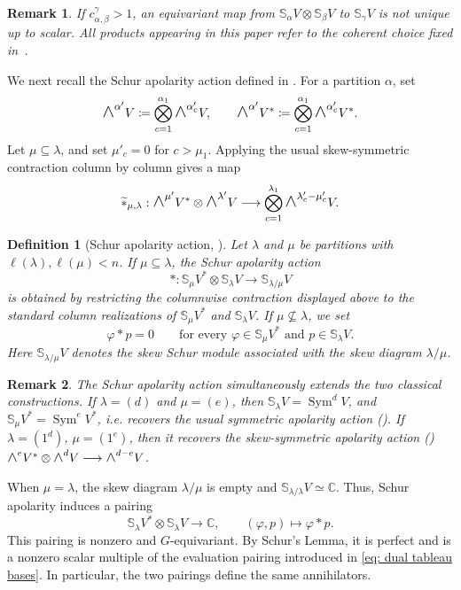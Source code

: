 \documentclass[a4paper,reqno]{amsart}
\theoremstyle{plainnopunct}
\theoremstyle{definitionnopunct}
\newtheorem{definition}[definition]{Definition}
\newtheorem{remark}[remark]{Remark}
\newcommand{\superwedge}{\mathlarger{\mathlarger{\wedge}}}
\newcommand{\C}{\mathbb{C}}
\renewcommand{\S}{\mathbb{S}}
\newcommand{\Sym}{\operatorname{Sym}}
\begin{document}
\begin{remark}
\label{rem: choice Schur multiplication}
If $c_{\alpha,\beta}^{\gamma}>1$, an equivariant map from $\S_\alpha V\otimes\S_\beta V$ to $\S_\gamma V$ is not unique up to scalar. All products appearing in this paper refer to the coherent choice fixed in~\cite{Staffolani2023}.
\end{remark}

We next recall the Schur apolarity action defined in \cite{Staffolani2023}. For a partition $\alpha$, set
\[
\superwedge^{\alpha'}V
\coloneq
\bigotimes_{c=1}^{\alpha_1}
\superwedge^{\alpha'_c}V,
\qquad
\superwedge^{\alpha'}V^*
\coloneq
\bigotimes_{c=1}^{\alpha_1}
\superwedge^{\alpha'_c}V^*.
\]
Let $\mu\subseteq\lambda$, and set $\mu'_c=0$ for $c>\mu_1$.
Applying the usual skew-symmetric contraction column by column gives a map
\[\widetilde{*}_{\mu,\lambda}:
\superwedge^{\mu'}V^*
\otimes
\superwedge^{\lambda'}V
\longrightarrow
\bigotimes_{c=1}^{\lambda_1}
\superwedge^{\lambda'_c-\mu'_c}V.
\]

\begin{definition}[Schur apolarity action, {\cite[Definition~3.3]{Staffolani2023}}]
\label{def: Schur apolarity}
Let $\lambda$ and $\mu$ be partitions with $\ell(\lambda),\ell(\mu)<n$. If $\mu\subseteq\lambda$, the \emph{Schur apolarity action}
\[
*:
\S_\mu V^*\otimes\S_\lambda V
\longrightarrow
\S_{\lambda/\mu}V
\]
is obtained by restricting the columnwise contraction displayed above to the standard column realizations of $\S_\mu V^*$ and $\S_\lambda V$. If $\mu\not\subseteq\lambda$, we set
\[
\varphi*p=0
\qquad
\text{for every }
\varphi\in\S_\mu V^*
\text{ and }
p\in\S_\lambda V.
\]
Here $\S_{\lambda/\mu}V$ denotes the skew Schur module associated with the skew diagram $\lambda/\mu$.
\end{definition}

\begin{remark}
\label{rem: classical specializations Schur apolarity}
The Schur apolarity action simultaneously extends the two classical constructions. If $\lambda=(d)$ and $\mu=(e)$, then $\S_\lambda V=\Sym^dV$, and $\S_\mu V^*=\Sym^eV^*$, i.e.  recovers the usual symmetric apolarity action (\cite{bernardi_hitchhiker_2018}). If $\lambda=(1^d)$, $\mu=(1^e)$, then it recovers the skew-symmetric apolarity action (\cite{ArrondoBernardiMarquesMourrain2021})
$\superwedge^eV^*
\otimes
\superwedge^dV
\longrightarrow
\superwedge^{d-e}V$.
\end{remark}

When $\mu=\lambda$, the skew diagram $\lambda/\mu$ is empty and $\S_{\lambda/\lambda}V\simeq\C$. Thus, Schur apolarity induces a pairing\[\S_\lambda V^*
\otimes
\S_\lambda V
\longrightarrow
\C,
\qquad
(\varphi,p)
\longmapsto
\varphi*p.\]
This pairing is nonzero and $G$-equivariant. By Schur's Lemma, it is perfect and is a nonzero scalar multiple of the evaluation pairing introduced in \eqref{eq: dual tableau bases}. In particular, the two pairings define the same annihilators.
\end{document}
